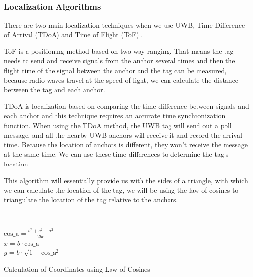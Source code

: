 \documentclass[journal,onecolumn, draftclsnofoot, 12pt]{IEEEtran}
\begin{document}
\vspace{0.5cm}

\subsubsection{Localization Algorithms}
\label{sec:Localization}

There are two main localization techniques when we use UWB, Time Difference of Arrival (TDoA) and Time of Flight (ToF) \cite{localization}.

ToF is a positioning method based on two-way ranging. That means the tag needs to send and receive signals from the anchor several times and then the flight time of the signal between the anchor and the tag can be measured, because radio waves travel at the speed of light, we can calculate the distance between the tag and each anchor.

TDoA is localization based on comparing the time difference between signals and each anchor and this technique requires an accurate time synchronization function. When using the TDoA method, the UWB tag will send out a poll message, and all the nearby UWB anchors will receive it and record the arrival time. Because the location of anchors is different, they won’t receive the message at the same time. We can use these time differences to determine the tag’s location.

This algorithm will essentially provide us with the sides of a triangle, with which we can calculate the location of the tag, we will be using the law of cosines to triangulate the location of the tag relative to the anchors.

\begin{algorithm}[H]
    \SetAlgoLined
    
    \\

    
    $ \text{cos\_a} = \frac{{b^2 + c^2 - a^2}}{{2bc}} $\; \\
    $ x = b \cdot \text{cos\_a} $\; \\
    $ y = b \cdot \sqrt{1 - \text{cos\_a}^2} $\; \\
    
    \;
    
    \caption{Calculation of Coordinates using Law of Cosines}
\end{algorithm}
\end{document}
